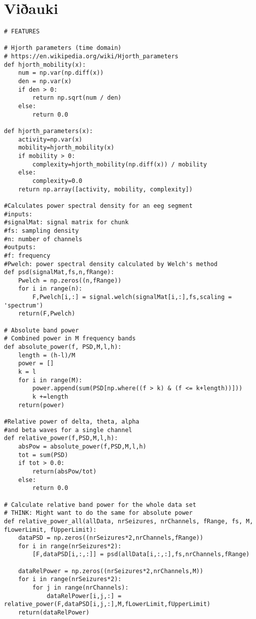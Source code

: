 \documentclass[11pt]{article}
\begin{document}
\section*{Viðauki}
\begin{verbatim}
# FEATURES

# Hjorth parameters (time domain)
# https://en.wikipedia.org/wiki/Hjorth_parameters
def hjorth_mobility(x):
    num = np.var(np.diff(x))
    den = np.var(x)
    if den > 0:
        return np.sqrt(num / den)
    else:
        return 0.0

def hjorth_parameters(x):
    activity=np.var(x)
    mobility=hjorth_mobility(x)
    if mobility > 0:
        complexity=hjorth_mobility(np.diff(x)) / mobility
    else:
        complexity=0.0
    return np.array([activity, mobility, complexity])

#Calculates power spectral density for an eeg segment
#inputs: 
#signalMat: signal matrix for chunk
#fs: sampling density
#n: number of channels
#outputs: 
#f: frequency
#Pwelch: power spectral density calculated by Welch's method
def psd(signalMat,fs,n,fRange):
    Pwelch = np.zeros((n,fRange))
    for i in range(n):
        F,Pwelch[i,:] = signal.welch(signalMat[i,:],fs,scaling = 'spectrum')
    return(F,Pwelch)

# Absolute band power
# Combined power in M frequency bands
def absolute_power(f, PSD,M,l,h):
    length = (h-l)/M
    power = []
    k = l
    for i in range(M):
        power.append(sum(PSD[np.where((f > k) & (f <= k+length))]))
        k +=length
    return(power)
    
#Relative power of delta, theta, alpha 
#and beta waves for a single channel
def relative_power(f,PSD,M,l,h):
    absPow = absolute_power(f,PSD,M,l,h)
    tot = sum(PSD)
    if tot > 0.0:
        return(absPow/tot)
    else:
        return 0.0

# Calculate relative band power for the whole data set
# THINK: Might want to do the same for absolute power
def relative_power_all(allData, nrSeizures, nrChannels, fRange, fs, M, fLowerLimit, fUpperLimit):
    dataPSD = np.zeros((nrSeizures*2,nrChannels,fRange))
    for i in range(nrSeizures*2):
        [F,dataPSD[i,:,:]] = psd(allData[i,:,:],fs,nrChannels,fRange)

    dataRelPower = np.zeros((nrSeizures*2,nrChannels,M))
    for i in range(nrSeizures*2):
        for j in range(nrChannels):
            dataRelPower[i,j,:] = relative_power(F,dataPSD[i,j,:],M,fLowerLimit,fUpperLimit)
    return(dataRelPower)
    

\end{verbatim}
\end{document}
